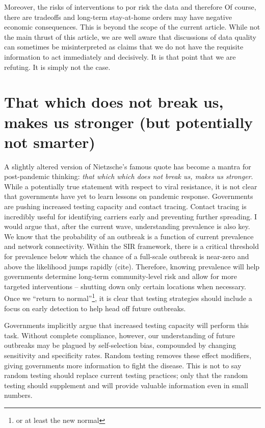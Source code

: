\documentclass[aoas]{amsart}
\begin{document}
Moreover, the risks of interventions to por risk   the data and therefore
Of course, there are tradeoffs and long-term stay-at-home orders may have negative economic consequences.  This is beyond the scope of the current article.  While not the main thrust of this article, we are well aware that discussions of data quality can sometimes be misinterpreted as claims that we do not have the requisite information to act immediately and decisively.  It is that point that we are refuting.  It is simply not the case.

\section{That which does not break us, makes us stronger (but potentially not smarter)}

A slightly altered version of Nietzsche's famous quote has become a mantra for post-pandemic thinking: \emph{that which which does not break us, makes us stronger}.  While a potentially true statement with respect to viral resistance, it is not clear that governments have yet to learn lessons on pandemic response. Governments are pushing increased testing capacity and contact tracing.  Contact tracing is incredibly useful for identifying carriers early and preventing further spreading.  I would argue that, after the current wave, understanding prevalence is also key.  We know that the probability of an outbreak is a function of current prevalence and network connectivity.  Within the SIR framework, there is a critical threshold for  prevalence below which the chance of a full-scale outbreak is near-zero and above the likelihood jumps rapidly (cite).  Therefore, knowing prevalence will help governments determine long-term community-level risk and allow for more targeted interventions -- shutting down only certain locations when necessary. Once we ``return to normal''\footnote{or at least the new normal}, it is clear that testing strategies should include a focus on early detection to help head off future outbreaks.

Governments implicitly argue that increased testing capacity will perform this task.  Without complete compliance, however, our understanding of future outbreaks may be plagued by self-selection bias, compounded by changing sensitivity and specificity rates.  Random testing removes these effect modifiers, giving governments more information to fight the disease.  This is not to say random testing should replace current testing practices; only that the random testing should supplement and will provide valuable information even in small numbers.
\end{document}
